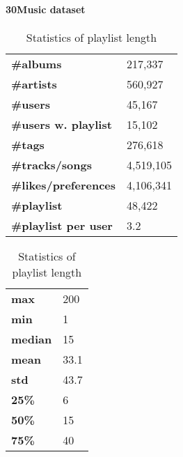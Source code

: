 \paragraph{30Music dataset~\cite{turrin201530music}}

\begin{table}
\begin{minipage}[c]{.5\textwidth}
\caption{Statistics of the 30Music dataset}
\label{tab:30music_stats}
\centering
\begin{tabular}{l|l} \hline
\textbf{\#albums}            & 217,337   \\
\textbf{\#artists}           & 560,927   \\
\textbf{\#users}             & 45,167    \\
\textbf{\#users w. playlist} & 15,102    \\
\textbf{\#tags}              & 276,618   \\
\textbf{\#tracks/songs}      & 4,519,105 \\
\textbf{\#likes/preferences} & 4,106,341 \\
\textbf{\#playlist}          & 48,422    \\
\textbf{\#playlist per user} & 3.2       \\ \hline
\end{tabular}
\end{minipage}
\hfill
\begin{minipage}[c]{.5\textwidth}
\caption{Statistics of playlist length}
\label{tab:30music_playlist}
\centering
\begin{tabular}{l|l} \hline
\textbf{max}    & 200   \\
\textbf{min}    & 1     \\
\textbf{median} & 15    \\
\textbf{mean}   & 33.1  \\
\textbf{std}    & 43.7  \\
\textbf{25\%}   & 6     \\
\textbf{50\%}   & 15    \\
\textbf{75\%}   & 40    \\ \hline
\end{tabular}
\end{minipage}
\end{table}

